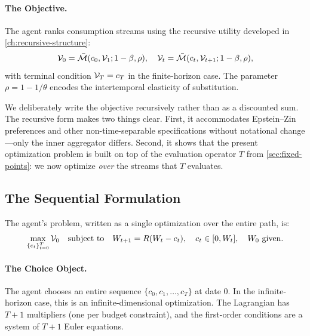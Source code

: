 \paragraph{The Objective.}
The agent ranks consumption streams using the recursive utility developed in \cref{ch:recursive-structure}:
\begin{equation}
\mathcal{V}_0 = \bar{\mathcal{M}}(c_0, \mathcal{V}_1; 1-\beta, \rho), \quad \mathcal{V}_t = \bar{\mathcal{M}}(c_t, \mathcal{V}_{t+1}; 1-\beta, \rho),
\label{eq:dp-recursive-objective}
\end{equation}
with terminal condition $\mathcal{V}_T = c_T$ in the finite-horizon case. The parameter $\rho = 1 - 1/\theta$ encodes the intertemporal elasticity of substitution.

\begin{calloutnote}
We deliberately write the objective recursively rather than as a discounted sum. The recursive form makes two things clear. First, it accommodates Epstein--Zin preferences and other non-time-separable specifications without notational change---only the inner aggregator differs. Second, it shows that the present optimization problem is built on top of the evaluation operator $T$ from \cref{sec:fixed-points}: we now optimize \emph{over} the streams that $T$ evaluates.
\end{calloutnote}

\subsection{The Sequential Formulation}
\label{subsec:dp-sequential}

The agent's problem, written as a single optimization over the entire path, is:
\begin{equation}
\max_{\{c_t\}_{t=0}^{T}} \mathcal{V}_0 \quad \text{subject to} \quad W_{t+1} = R(W_t - c_t), \quad c_t \in [0, W_t], \quad W_0 \text{ given}.
\label{eq:sequence-problem}
\end{equation}

\paragraph{The Choice Object.}
The agent chooses an entire sequence $\{c_0, c_1, \ldots, c_T\}$ at date $0$. In the infinite-horizon case, this is an infinite-dimensional optimization. The Lagrangian has $T+1$ multipliers (one per budget constraint), and the first-order conditions are a system of $T+1$ Euler equations.

